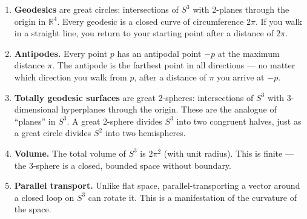 \documentclass[twocolumn,10pt]{article}
\begin{document}
\begin{enumerate}
    \item \textbf{Geodesics} are great circles: intersections of $S^3$ with 2-planes through the origin in $\mathbb{R}^4$. Every geodesic is a closed curve of circumference $2\pi$. If you walk in a straight line, you return to your starting point after a distance of $2\pi$.

    \item \textbf{Antipodes.} Every point $p$ has an antipodal point $-p$ at the maximum distance $\pi$. The antipode is the farthest point in all directions --- no matter which direction you walk from $p$, after a distance of $\pi$ you arrive at $-p$.

    \item \textbf{Totally geodesic surfaces} are great 2-spheres: intersections of $S^3$ with 3-dimensional hyperplanes through the origin. These are the analogue of ``planes'' in $S^3$. A great 2-sphere divides $S^3$ into two congruent halves, just as a great circle divides $S^2$ into two hemispheres.

    \item \textbf{Volume.} The total volume of $S^3$ is $2\pi^2$ (with unit radius). This is finite --- the 3-sphere is a closed, bounded space without boundary.

    \item \textbf{Parallel transport.} Unlike flat space, parallel-transporting a vector around a closed loop on $S^3$ can rotate it. This is a manifestation of the curvature of the space.
\end{enumerate}
\end{document}
